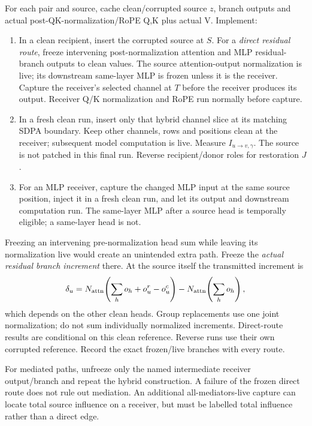 \documentclass[11pt,a4paper]{article}
\begin{document}
For each pair and source, cache clean/corrupted source $z$, branch outputs and actual
post-QK-normalization/RoPE Q,K plus actual V. Implement:
\begin{enumerate}
\item In a clean recipient, insert the corrupted source at $S$. For a
\emph{direct residual route}, freeze intervening post-normalization attention and
MLP residual-branch outputs to clean values. The source attention-output normalization
is live; its downstream same-layer MLP is frozen unless it is the receiver. Capture
the receiver's selected channel at $T$ before the receiver produces its output.
Receiver Q/K normalization and RoPE run normally before capture.
\item In a fresh clean run, insert only that hybrid channel slice at its matching
SDPA boundary. Keep other channels, rows and positions clean at the receiver;
subsequent model computation is live. Measure $I_{u\to v,\gamma}$. The source is
not patched in this final run. Reverse recipient/donor roles for restoration $J$.
\item For an MLP receiver, capture the changed MLP input at the same source position,
inject it in a fresh clean run, and let its output and downstream computation run.
The same-layer MLP after a source head is temporally eligible; a same-layer head is not.
\end{enumerate}

Freezing an intervening pre-normalization head sum while leaving its normalization
live would create an unintended extra path. Freeze the \emph{actual residual branch
increment} there. At the source itself the transmitted increment is
\[
 \delta_u=N_{\rm attn}\!\left(\sum_h o_h+o_u^r-o_u^c\right)
             -N_{\rm attn}\!\left(\sum_h o_h\right),
\]
which depends on the other clean heads. Group replacements use one joint
normalization; do not sum individually normalized increments. Direct-route results
are conditional on this clean reference. Reverse runs use their own corrupted
reference. Record the exact frozen/live branches with every route.

For mediated paths, unfreeze only the named intermediate receiver output/branch and
repeat the hybrid construction. A failure of the frozen direct route does not rule
out mediation. An additional all-mediators-live capture can locate total source
influence on a receiver, but must be labelled total influence rather than a direct edge.
\end{document}
